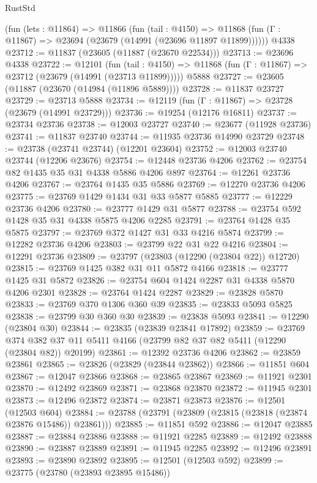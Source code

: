 \begin{lexlean}{RustStd}
\begin{coremodule}
{\begin{coremodule}
{{{{{{{{{{{{{{{{{{{{{{{{{{{{{{{{{{{{{{{{{{{{{{{{{{    (fun (lets : @11864) =>
    @11866
      (fun (tail : @4150) =>
      @11868 (fun (Γ : @11867) => @23694 (@23679 (@14991 (@23696 @11897 @11899))))))
    @4338
@23712 := @11837 (@23605 (@11887 (@23670 @22534)))
@23713 := @23696 @4338
@23722 := @12101
    (fun (tail : @4150) => @11868 (fun (Γ : @11867) => @23712 (@23679 (@14991 (@23713 @11899)))))
    @5888
@23727 := @23605 (@11887 (@23670 (@14984 (@11896 @5889))))
@23728 := @11837 @23727
@23729 := @23713 @5888
@23734 := @12119 (fun (Γ : @11867) => @23728 (@23679 (@14991 @23729)))
@23736 := @19254 (@12176 @16811)
@23737 := @23734 @23736
@23738 := @12003 @23727
@23740 := @23677 (@11928 @23736)
@23741 := @11837 @23740
@23744 := @11935 @23736 @14990 @23729
@23748 := @23738 (@23741 @23744) (@12201 @23604)
@23752 := @12003 @23740 @23744 (@12206 @23676)
@23754 := @12448 @23736 @4206
@23762 := @23754 @82 @1435 @35 @31 @4338 @5886 @4206 @897
@23764 := @12261 @23736 @4206
@23767 := @23764 @1435 @35 @5886
@23769 := @12270 @23736 @4206
@23775 := @23769 @1429 @1434 @31 @33 @5877 @5885
@23777 := @12229 @23736 @4206
@23780 := @23777 @1429 @31 @5877
@23788 := @23754 @592 @1428 @35 @31 @4338 @5875 @4206 @2285
@23791 := @23764 @1428 @35 @5875
@23797 := @23769 @372 @1427 @31 @33 @4216 @5874
@23799 := @12282 @23736 @4206
@23803 := @23799 @22 @31 @22 @4216
@23804 := @12291 @23736
@23809 := @23797 (@23803 (@12290 (@23804 @22)) @12720)
@23815 := @23769 @1425 @382 @31 @11 @5872 @4166
@23818 := @23777 @1425 @31 @5872
@23826 := @23754 @604 @1424 @2287 @31 @4338 @5870 @4206 @2301
@23828 := @23764 @1424 @2287
@23829 := @23828 @5870
@23833 := @23769 @370 @1306 @360 @39
@23835 := @23833 @5093 @5825
@23838 := @23799 @30 @360 @30
@23839 := @23838 @5093
@23841 := @12290 (@23804 @30)
@23844 := @23835 (@23839 @23841 @17892)
@23859 := @23769
    @374
    @382
    @37
    @11
    @5411
    @4166
    (@23799 @82 @37 @82 @5411 (@12290 (@23804 @82)) @20199)
@23861 := @12392 @23736 @4206
@23862 := @23859 @23861
@23865 := @23826 (@23829 (@23844 @23862))
@23866 := @11851 @604
@23867 := @12047 @23866
@23868 := @23865 @23867
@23869 := @11921 @2301
@23870 := @12492 @23869
@23871 := @23868 @23870
@23872 := @11945 @2301
@23873 := @12496 @23872
@23874 := @23871 @23873
@23876 := @12501 (@12503 @604)
@23884 := @23788 (@23791 (@23809 (@23815 (@23818 (@23874 @23876 @15486)) @23861)))
@23885 := @11851 @592
@23886 := @12047 @23885
@23887 := @23884 @23886
@23888 := @11921 @2285
@23889 := @12492 @23888
@23890 := @23887 @23889
@23891 := @11945 @2285
@23892 := @12496 @23891
@23893 := @23890 @23892
@23895 := @12501 (@12503 @592)
@23899 := @23775 (@23780 (@23893 @23895 @15486))
}}}}}}}}}}}}}}}}}}}}}}}}}}}}}}}}}}}}}}}}}}}}}}}}}}
\end{coremodule}}
\end{coremodule}
\end{lexlean}
